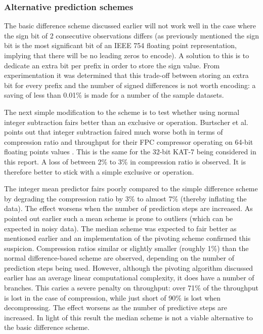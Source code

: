  \subsubsection{Alternative prediction schemes}
  The basic difference scheme discussed earlier will not work well in the case where the sign bit of 2 consecutive observations differs (as previously mentioned the sign bit is the most significant bit of an IEEE 754 
  floating point representation, implying that there will be no leading zeros to encode). A solution to this is to dedicate an extra bit per prefix in order to store the sign value. From experimentation it was determined that
  this trade-off between storing an extra bit for every prefix and the number of signed differences is not worth encoding: a saving of less than 0.01\% is made for a number of the sample datasets. 
  
  The next simple modification to the scheme is to test whether using normal integer subtraction fairs better than an exclusive or operation. Burtscher et al. points out that integer subtraction faired much worse both in terms of
  compression ratio and throughput for their FPC compressor operating on 64-bit floating points values \cite{4589203}. This is the same for the 32-bit KAT-7 being considered in this report. A loss of between 2\% to 3\% in 
  compression ratio is observed. It is therefore better to stick with a simple exclusive or operation.
  
  The integer mean predictor fairs poorly compared to the simple difference scheme by degrading the compression ratio by 3\% to almost 7\% (thereby inflating the data). The effect worsens when the number of prediction 
  steps are increased. As pointed out earlier such a mean scheme is prone to outliers (which can be expected in noisy data). The median scheme was expected to fair better as mentioned earlier and an implementation of the pivoting 
  scheme confirmed this suspicion. Compression ratios similar or slightly smaller (roughly 1\%) than the normal difference-based scheme are observed, depending on the number of prediction steps being used. However, although the 
  pivoting algorithm discussed earlier has an average linear computational complexity, it does have a number of branches. This caries a severe penalty on throughput: over 
  71\% of the throughput is lost in the case of compression, while just short of 90\% is lost when decompressing. The effect worsens as the number of predictive steps are increased. In light of this result the median scheme is not
  a viable alternative to the basic difference scheme.
  

